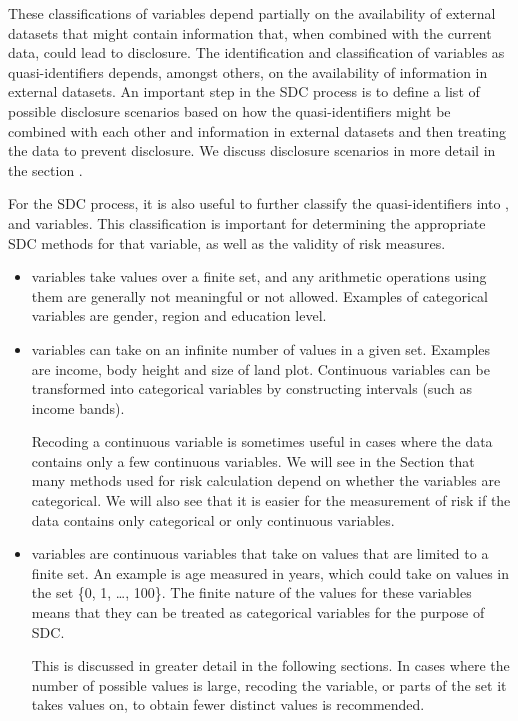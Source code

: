 \documentclass[letterpaper,10pt,english]{sphinxmanual}
\begin{document}
These classifications of variables depend partially on the
availability of external datasets that might contain information
that, when combined with the current data, could lead to disclosure.
The identification and classification of variables as
quasi-identifiers depends, amongst others, on the availability of
information in external datasets. An important step in the SDC
process is to define a list of possible disclosure scenarios based on
how the quasi-identifiers might be combined with each other and
information in external datasets and then treating the data to
prevent disclosure. We discuss disclosure scenarios in more detail in
the section {\hyperref[\detokenize{measure_risk:disclosure-scenarios}]{}}.

For the SDC process, it is also useful to further classify the
quasi-identifiers into ,  and
 variables. This classification is important for
determining the appropriate SDC methods for that variable, as well as
the validity of risk measures.
\begin{itemize}
\item {} 
 variables take values over a finite set, and any
arithmetic operations using them are generally not meaningful or not
allowed. Examples of categorical variables are gender, region and
education level.

\item {} 
 variables can take on an infinite number of values in
a given set. Examples are income, body height and size of land plot.
Continuous variables can be transformed into categorical variables by
constructing intervals (such as income bands). %
\begin{footnote}[1]\sphinxAtStartFootnote
Recoding a continuous variable is sometimes useful in cases where the
data contains only a few continuous variables. We will see in the Section
{\hyperref[\detokenize{measure_risk:individual-risk}]{}} that many methods used for risk calculation depend on whether the
variables are categorical. We will also see that it is easier for the
measurement of risk if the data contains only categorical or only
continuous variables.
%
\end{footnote}

\item {} 
 variables are continuous variables that take on
values that are limited to a finite set. An example is age measured
in years, which could take on values in the set \{0, 1, …, 100\}. The
finite nature of the values for these variables means that they can
be treated as categorical variables for the purpose of
SDC. %
\begin{footnote}[2]\sphinxAtStartFootnote
This is discussed in greater detail in the following sections. In
cases where the number of possible values is large, recoding the
variable, or parts of the set it takes values on, to obtain fewer
distinct values is recommended.
%
\end{footnote}

\end{itemize}
\end{document}

